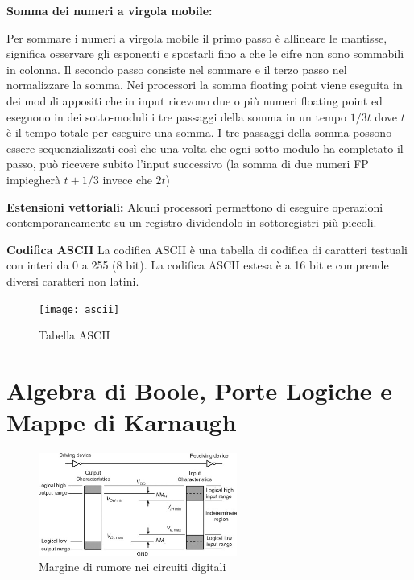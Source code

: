 \begin{defn}
	\textbf{Somma dei numeri a virgola mobile:}
	
	Per sommare i numeri a virgola mobile il primo passo è allineare le mantisse, significa osservare gli esponenti e spostarli fino a che le cifre non sono sommabili in colonna.
	Il secondo passo consiste nel sommare e il terzo passo nel normalizzare la somma. Nei processori la somma floating point viene eseguita in dei moduli appositi che in input ricevono due o più numeri floating point ed eseguono in dei sotto-moduli i tre passaggi della somma in un tempo $ 1/3 t $ dove $ t $ è il tempo totale per eseguire una somma. I tre passaggi della somma possono essere sequenzializzati così che una volta che ogni sotto-modulo ha completato il passo, può ricevere subito l'input successivo (la somma di due numeri FP impiegherà $ t + 1/3 $ invece che $ 2t $)
\end{defn}


\begin{defn}
	\textbf{Estensioni vettoriali:}
	Alcuni processori permettono di eseguire operazioni contemporaneamente su un registro dividendolo in sottoregistri più piccoli. 
\end{defn}


\begin{defn}
	\textbf{Codifica ASCII}
	La codifica ASCII è una tabella di codifica di caratteri testuali con interi da 0 a 255 (8 bit). La codifica ASCII estesa è a 16 bit e comprende diversi caratteri non latini.
	
	\begin{figure}
		\caption{Tabella ASCII}
		\texttt{[image: ascii]}
	\end{figure}
\end{defn}


\section{Algebra di Boole, Porte Logiche e Mappe di Karnaugh}

\begin{figure}
	\begin{center}
		\includegraphics[width=0.58\textwidth]{noisemargin}
	\end{center}
	\caption{Margine di rumore nei circuiti digitali}	
\end{figure}

